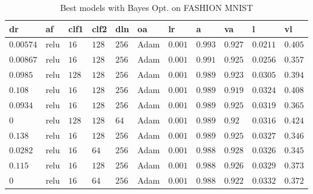 \begin{table}[htbp]\scriptsize
\begin{tabular}{|p{}p{}p{}p{}p{}p{}p{}p{}p{}p{}p{}|}\hline
dr & af & clf1 & clf2 & dln & oa & lr & a & va & l & vl \\ \hline
$0.00574$ & relu & $16$ & $128$ & $256$ & Adam & $0.001$ & $0.993$ & $0.927$ & $0.0211$ & $0.405$ \\
$0.00867$ & relu & $16$ & $128$ & $256$ & Adam & $0.001$ & $0.991$ & $0.925$ & $0.0256$ & $0.357$ \\
$0.0985$ & relu & $128$ & $128$ & $256$ & Adam & $0.001$ & $0.989$ & $0.923$ & $0.0305$ & $0.394$ \\
$0.108$ & relu & $16$ & $128$ & $256$ & Adam & $0.001$ & $0.989$ & $0.919$ & $0.0324$ & $0.408$ \\
$0.0934$ & relu & $16$ & $128$ & $256$ & Adam & $0.001$ & $0.989$ & $0.925$ & $0.0319$ & $0.365$ \\
$0$ & relu & $128$ & $128$ & $64$ & Adam & $0.001$ & $0.989$ & $0.92$ & $0.0316$ & $0.424$ \\
$0.138$ & relu & $16$ & $128$ & $256$ & Adam & $0.001$ & $0.989$ & $0.925$ & $0.0327$ & $0.346$ \\
$0.0282$ & relu & $16$ & $64$ & $256$ & Adam & $0.001$ & $0.988$ & $0.928$ & $0.0326$ & $0.345$ \\
$0.115$ & relu & $16$ & $128$ & $256$ & Adam & $0.001$ & $0.988$ & $0.926$ & $0.0329$ & $0.373$ \\
$0$ & relu & $16$ & $64$ & $256$ & Adam & $0.001$ & $0.988$ & $0.922$ & $0.0332$ & $0.372$ \\
\hline
\end{tabular}\vspace{0.1cm}
	\caption{Best models with Bayes Opt. on FASHION MNIST}
	\label{tab:bayes_params}
\end{table}
